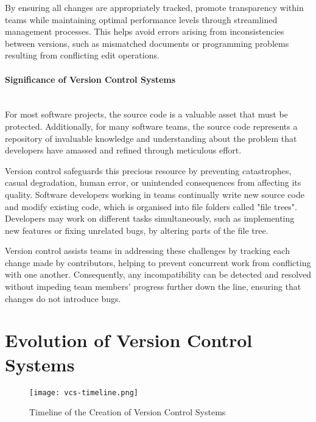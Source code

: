 By ensuring all changes are appropriately tracked,  promote transparency within teams while maintaining optimal performance levels through streamlined management processes. This helps avoid errors arising from inconsistencies between versions, such as mismatched documents or programming problems resulting from conflicting edit operations.

\paragraph{Significance of Version Control Systems}
\hfill\medskip\\
For most software projects, the source code is a valuable asset that must be protected. Additionally, for many software teams, the source code represents a repository of invaluable knowledge and understanding about the problem that developers have amassed and refined through meticulous effort.
\smallskip

Version control safeguards this precious resource by preventing catastrophes, casual degradation, human error, or unintended consequences from affecting its quality. Software developers working in teams continually write new source code and modify existing code, which is organised into file folders called "file trees". Developers may work on different tasks simultaneously, such as implementing new features or fixing unrelated bugs, by altering parts of the file tree.
\smallskip

Version control assists teams in addressing these challenges by tracking each change made by contributors, helping to prevent concurrent work from conflicting with one another. Consequently, any incompatibility can be detected and resolved without impeding team members' progress further down the line, ensuring that changes do not introduce bugs.

\section{Evolution of Version Control Systems}
\begin{figure}[htbp]
    \centering
    \texttt{[image: vcs-timeline.png]}
    \caption{Timeline of the Creation of Version Control Systems \cite{stopak_2019}}
    \label{fig:vcs-timeline}
\end{figure}
